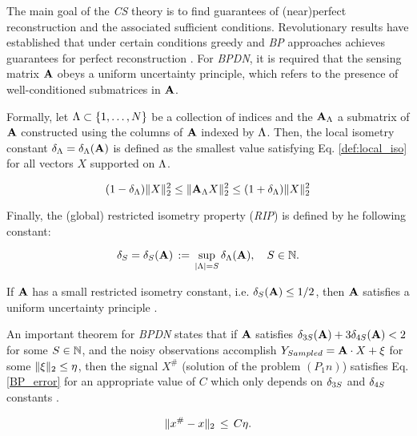 The main goal of the \emph{CS} theory is to find guarantees of (near)perfect reconstruction and the associated sufficient conditions. Revolutionary results have established that under certain conditions greedy and \emph{BP} approaches achieves guarantees for perfect reconstruction \citep{Candes_2006_a,Boyko_2011_a}. For \emph{BPDN}, it is required that the sensing matrix $\mathbf{A}$ obeys a uniform uncertainty principle, which refers to the presence of well-conditioned submatrices in $\mathbf{A}$. 

Formally, let $\Lambda \subset \{1,\hdots,N\}$ be a collection of indices and the $\mathbf{A}_\Lambda$ a submatrix of $\mathbf{A}$ constructed using the columns of $\mathbf{A}$ indexed by $\Lambda$. Then, the local isometry constant $\delta_\Lambda = \delta_\Lambda(\mathbf{A})$ is defined as the smallest value satisfying Eq. \eqref{def:local_iso} for all vectors $X$ supported on $\Lambda$.

\begin{equation}
(1-\delta_\Lambda) \|X\|_2^2 \leq \|\mathbf{A}_\Lambda X\|_2^2 \leq (1+\delta_\Lambda)\|X\|_2^2
\label{def:local_iso}
\end{equation}

Finally, the (global) restricted isometry property (\emph{RIP}) is defined by he following constant:

\begin{equation}
\delta_S = \delta_S(\mathbf{A}) \,:=\, \sup_{|\Lambda| = S}
\delta_\Lambda(\mathbf{A}),\quad S \in \mathbb{N}.
\label{def:global_isoConstant}
\end{equation}

If $\mathbf{A}$ has a small restricted isometry constant, i.e.  $\delta_S(\mathbf{A}) \leq 1/2$, then $\mathbf{A}$ satisfies a uniform uncertainty principle \citep{Candes_2006_a}. 

An important theorem for \emph{BPDN} states that if $\mathbf{A}$ satisfies $ \delta_{3S}(\mathbf{A}) + 3 \delta_{4S}(\mathbf{A}) < 2 $ for some $S \in \mathbb{N}$, and the noisy observations accomplish $Y_{Sampled}=\mathbf{A} \cdot X + \xi$ for some $\|\xi\|_2 \leq {\eta}$, then the signal $X^\#$ (solution of the problem $(P_1n)$) satisfies Eq. \eqref{BP_error} for an appropriate value of $C$ which only depends on $\delta_{3S}$ and $\delta_{4S}$ constants \citep{Eldar_2012_a}.

\begin{equation}
\label{BP_error}
\|x^\# - x\|_2 \,\leq\, C \nlevel. %
\end{equation}

